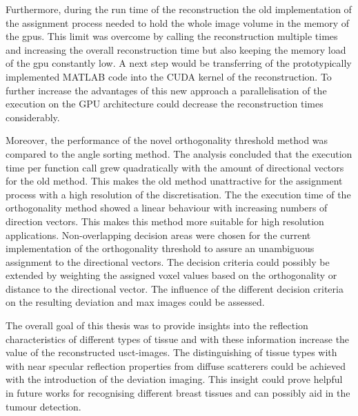 Furthermore, during the run time of the reconstruction the old implementation of the assignment process needed to hold the whole image volume in the memory of the \acp{gpu}. This limit was overcome by calling the reconstruction multiple times and increasing the overall reconstruction time but also keeping the memory load of the \ac{gpu} constantly low. A next step would be transferring of the prototypically implemented MATLAB code into the CUDA kernel of the reconstruction. To further increase the advantages of this new approach a parallelisation of the execution on the \ac{GPU} architecture could decrease the reconstruction times considerably.


Moreover, the performance of the novel orthogonality threshold method was compared to the angle sorting method. The analysis concluded that the execution time per function call grew quadratically with the amount of directional vectors for the old method. This makes the old method unattractive for the assignment process with a high resolution of the discretisation. The the execution time of the orthogonality method showed a linear behaviour with increasing numbers of direction vectors. This makes this method more suitable for high resolution applications. Non-overlapping decision areas were chosen for the current implementation of the orthogonality threshold to assure an unambiguous assignment to the directional vectors. The decision criteria could possibly be extended by weighting the assigned voxel values based on the orthogonality or distance to the directional vector. The influence of the different decision criteria on the resulting deviation and max images could be assessed.


The overall goal of this thesis was to provide insights into the reflection characteristics of different types of tissue and with these information increase the value of the reconstructed \ac{usct}-images. The distinguishing of tissue types with with near specular reflection properties from diffuse scatterers could be achieved with the introduction of the deviation imaging. This insight could prove helpful in future works for recognising different breast tissues and can possibly aid in the tumour detection.









